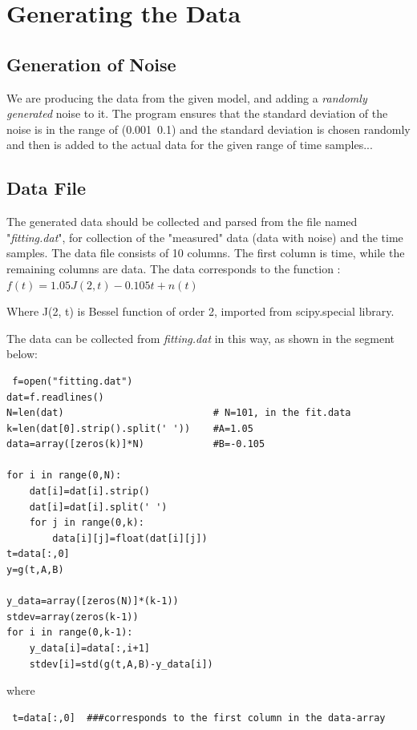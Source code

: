 \documentclass[10pt,english, openany]{book}
\begin{document}
\vspace{1cm}
\section{Generating the Data}

\subsection{Generation of Noise}
We are producing the data from the given model, and adding a \textit{randomly generated} noise to it.
 The program ensures that the standard deviation of the noise is in the range of (0.001~0.1) and the standard deviation is chosen randomly and then is added to the actual data for the given range of time samples... 
 \par
 \subsection{Data File}
 The generated data should be collected and parsed from the file named "\textit{fitting.dat}", for collection of the "measured" data (data with noise) and the time samples. The data file consists of 10 columns. The first column is time, while the remaining columns are data. The data corresponds to the function : $f(t) = 1.05J(2, t) - 0.105t + n(t)$\par
 Where J(2, t) is Bessel function of order 2, imported from scipy.special library.\par
 The data can be collected from \textit{fitting.dat} in this way, as shown in the segment below:
 \begin{verbatim}
 f=open("fitting.dat")
dat=f.readlines()
N=len(dat)							# N=101, in the fit.data
k=len(dat[0].strip().split(' '))	#A=1.05
data=array([zeros(k)]*N)			#B=-0.105

for i in range(0,N):
	dat[i]=dat[i].strip()
	dat[i]=dat[i].split(' ')
	for j in range(0,k):
		data[i][j]=float(dat[i][j])
t=data[:,0]
y=g(t,A,B)

y_data=array([zeros(N)]*(k-1))
stdev=array(zeros(k-1))
for i in range(0,k-1):
	y_data[i]=data[:,i+1]
	stdev[i]=std(g(t,A,B)-y_data[i])
 \end{verbatim}
 where 
 \begin{verbatim}
 t=data[:,0]  ###corresponds to the first column in the data-array
 \end{verbatim}
\end{document}
